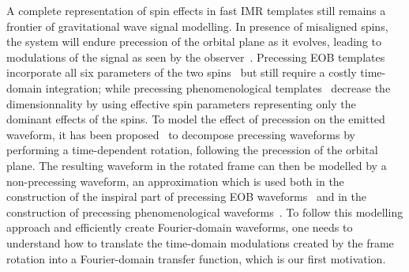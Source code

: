 \documentclass[aps,showpacs,twocolumn,
prd,superscriptaddress,nofootinbib]{revtex4-1}
\begin{document}
A complete representation of spin effects in fast IMR templates still remains a frontier of gravitational wave signal modelling. In presence of misaligned spins, the system will endure precession of the orbital plane as it evolves, leading to modulations of the signal as seen by the observer~\cite{ACST94}. Precessing EOB templates incorporate all six parameters of the two spins~\cite{Pan+13, BTB16} but still require a costly time-domain integration; while precessing phenomenological templates~\cite{Hannam+13} decrease the dimensionnality by using effective spin parameters representing only the dominant effects of the spins. To model the effect of precession on the emitted waveform, it has been proposed~\cite{BCV03b, BCPTV05, Schmidt+10, OShaughnessy+11, Boyle+11} to decompose precessing waveforms by performing a time-dependent rotation, following the precession of the orbital plane. The resulting waveform in the rotated frame can then be modelled by a non-precessing waveform, an approximation which is used both in the construction of the inspiral part of precessing EOB waveforms~\cite{Pan+13} and in the construction of precessing phenomenological waveforms~\cite{Hannam+13}. To follow this modelling approach and efficiently create Fourier-domain waveforms, one needs to understand how to translate the time-domain modulations created by the frame rotation into a Fourier-domain transfer function, which is our first motivation.
\end{document}
